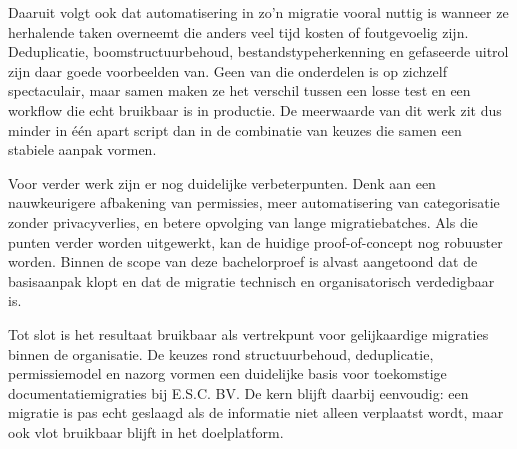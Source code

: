 Daaruit volgt ook dat automatisering in zo'n migratie vooral nuttig is wanneer ze herhalende taken overneemt die anders veel tijd kosten of foutgevoelig zijn. Deduplicatie, boomstructuurbehoud, bestandstypeherkenning en gefaseerde uitrol zijn daar goede voorbeelden van. Geen van die onderdelen is op zichzelf spectaculair, maar samen maken ze het verschil tussen een losse test en een workflow die echt bruikbaar is in productie. De meerwaarde van dit werk zit dus minder in één apart script dan in de combinatie van keuzes die samen een stabiele aanpak vormen.

Voor verder werk zijn er nog duidelijke verbeterpunten. Denk aan een nauwkeurigere afbakening van permissies, meer automatisering van categorisatie zonder privacyverlies, en betere opvolging van lange migratiebatches. Als die punten verder worden uitgewerkt, kan de huidige proof-of-concept nog robuuster worden. Binnen de scope van deze bachelorproef is alvast aangetoond dat de basisaanpak klopt en dat de migratie technisch en organisatorisch verdedigbaar is.

Tot slot is het resultaat bruikbaar als vertrekpunt voor gelijkaardige migraties binnen de organisatie. De keuzes rond structuurbehoud, deduplicatie, permissiemodel en nazorg vormen een duidelijke basis voor toekomstige documentatiemigraties bij E.S.C. BV. De kern blijft daarbij eenvoudig: een migratie is pas echt geslaagd als de informatie niet alleen verplaatst wordt, maar ook vlot bruikbaar blijft in het doelplatform.


